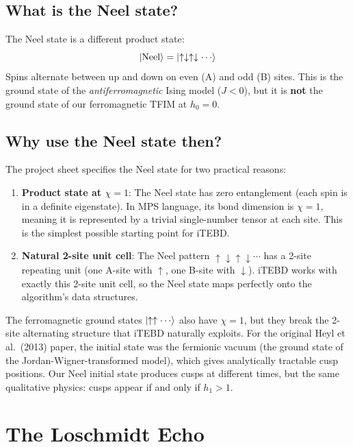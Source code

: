 \documentclass[11pt, a4paper]{article}
\begin{document}
\subsection{What is the Neel state?}

The Neel state is a different product state:
\begin{equation}
  \ket{\text{Neel}} = \ket{\uparrow\downarrow\uparrow\downarrow\cdots}
\end{equation}
Spins alternate between up and down on even (A) and odd (B) sites. This is the ground state of the \emph{antiferromagnetic} Ising model ($J < 0$), but it is \textbf{not} the ground state of our ferromagnetic TFIM at $h_0 = 0$.

\subsection{Why use the Neel state then?}

The project sheet specifies the Neel state for two practical reasons:
\begin{enumerate}
  \item \textbf{Product state at $\chi = 1$}: The Neel state has zero entanglement (each spin is in a definite eigenstate). In MPS language, its bond dimension is $\chi = 1$, meaning it is represented by a trivial single-number tensor at each site. This is the simplest possible starting point for iTEBD.
  \item \textbf{Natural 2-site unit cell}: The Neel pattern $\uparrow\downarrow\uparrow\downarrow\cdots$ has a 2-site repeating unit (one A-site with $\uparrow$, one B-site with $\downarrow$). iTEBD works with exactly this 2-site unit cell, so the Neel state maps perfectly onto the algorithm's data structures.
\end{enumerate}

The ferromagnetic ground states $\ket{\uparrow\uparrow\cdots}$ also have $\chi = 1$, but they break the 2-site alternating structure that iTEBD naturally exploits. For the original Heyl et al.\ (2013) paper, the initial state was the fermionic vacuum (the ground state of the Jordan-Wigner-transformed model), which gives analytically tractable cusp positions. Our Neel initial state produces cusps at different times, but the same qualitative physics: cusps appear if and only if $h_1 > 1$.

\section{The Loschmidt Echo}
\label{sec:loschmidt}
\end{document}
